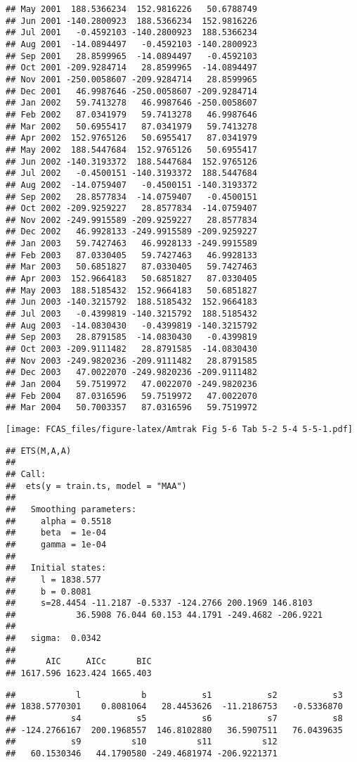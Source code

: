 \documentclass[]{article}
\begin{document}
\begin{verbatim}
## May 2001  188.5366234  152.9816226   50.6788749
## Jun 2001 -140.2800923  188.5366234  152.9816226
## Jul 2001   -0.4592103 -140.2800923  188.5366234
## Aug 2001  -14.0894497   -0.4592103 -140.2800923
## Sep 2001   28.8599965  -14.0894497   -0.4592103
## Oct 2001 -209.9284714   28.8599965  -14.0894497
## Nov 2001 -250.0058607 -209.9284714   28.8599965
## Dec 2001   46.9987646 -250.0058607 -209.9284714
## Jan 2002   59.7413278   46.9987646 -250.0058607
## Feb 2002   87.0341979   59.7413278   46.9987646
## Mar 2002   50.6955417   87.0341979   59.7413278
## Apr 2002  152.9765126   50.6955417   87.0341979
## May 2002  188.5447684  152.9765126   50.6955417
## Jun 2002 -140.3193372  188.5447684  152.9765126
## Jul 2002   -0.4500151 -140.3193372  188.5447684
## Aug 2002  -14.0759407   -0.4500151 -140.3193372
## Sep 2002   28.8577834  -14.0759407   -0.4500151
## Oct 2002 -209.9259227   28.8577834  -14.0759407
## Nov 2002 -249.9915589 -209.9259227   28.8577834
## Dec 2002   46.9928133 -249.9915589 -209.9259227
## Jan 2003   59.7427463   46.9928133 -249.9915589
## Feb 2003   87.0330405   59.7427463   46.9928133
## Mar 2003   50.6851827   87.0330405   59.7427463
## Apr 2003  152.9664183   50.6851827   87.0330405
## May 2003  188.5185432  152.9664183   50.6851827
## Jun 2003 -140.3215792  188.5185432  152.9664183
## Jul 2003   -0.4399819 -140.3215792  188.5185432
## Aug 2003  -14.0830430   -0.4399819 -140.3215792
## Sep 2003   28.8791585  -14.0830430   -0.4399819
## Oct 2003 -209.9111482   28.8791585  -14.0830430
## Nov 2003 -249.9820236 -209.9111482   28.8791585
## Dec 2003   47.0022070 -249.9820236 -209.9111482
## Jan 2004   59.7519972   47.0022070 -249.9820236
## Feb 2004   87.0316596   59.7519972   47.0022070
## Mar 2004   50.7003357   87.0316596   59.7519972
\end{verbatim}

\texttt{[image: FCAS\_files/figure-latex/Amtrak Fig 5-6 Tab 5-2 5-4 5-5-1.pdf]}

\begin{verbatim}
## ETS(M,A,A) 
## 
## Call:
##  ets(y = train.ts, model = "MAA") 
## 
##   Smoothing parameters:
##     alpha = 0.5518 
##     beta  = 1e-04 
##     gamma = 1e-04 
## 
##   Initial states:
##     l = 1838.577 
##     b = 0.8081 
##     s=28.4454 -11.2187 -0.5337 -124.2766 200.1969 146.8103
##            36.5908 76.044 60.153 44.1791 -249.4682 -206.9221
## 
##   sigma:  0.0342
## 
##      AIC     AICc      BIC 
## 1617.596 1623.424 1665.403
\end{verbatim}

\begin{verbatim}
##            l            b           s1           s2           s3 
## 1838.5770301    0.8081064   28.4453626  -11.2186753   -0.5336870 
##           s4           s5           s6           s7           s8 
## -124.2766167  200.1968557  146.8102880   36.5907511   76.0439635 
##           s9          s10          s11          s12 
##   60.1530346   44.1790580 -249.4681974 -206.9221371
\end{verbatim}
\end{document}
